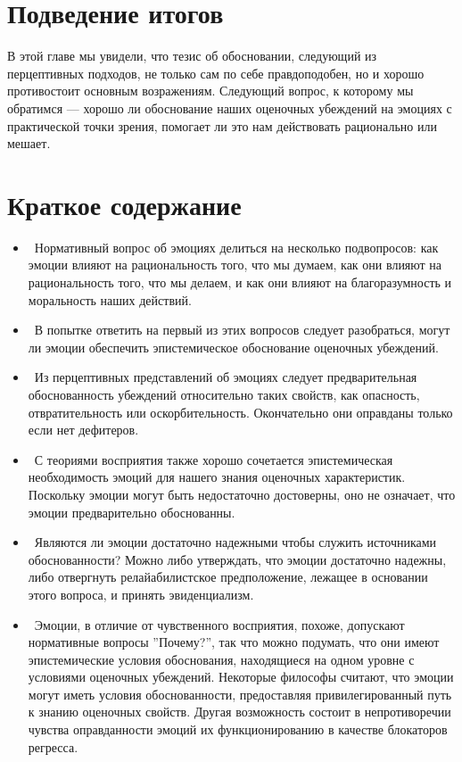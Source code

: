 \documentclass[11pt]{book}
\begin{document}
\section{Подведение итогов}

В этой главе мы увидели, что тезис об обосновании, следующий из перцептивных подходов, не только сам по себе правдоподобен, но и хорошо противостоит основным возражениям. Следующий вопрос, к которому мы обратимся --- хорошо ли обоснование наших оценочных убеждений на эмоциях с практической точки зрения, помогает ли это нам действовать рационально или мешает.

\section{Краткое содержание}

\begin{itemize}
  \item\ Нормативный вопрос об эмоциях делиться на несколько подвопросов: как эмоции влияют на рациональность того, что мы думаем, как они влияют на рациональность того, что мы делаем, и как они влияют на благоразумность и моральность наших действий.
  \item\ В попытке ответить на первый из этих вопросов следует разобраться, могут ли эмоции обеспечить эпистемическое обоснование оценочных убеждений.
  \item\ Из перцептивных представлений об эмоциях следует предварительная обоснованность убеждений относительно таких свойств, как опасность, отвратительность или оскорбительность. Окончательно они оправданы только если нет дефитеров.
  \item\ С теориями восприятия также хорошо сочетается эпистемическая необходимость эмоций для нашего знания оценочных характеристик. Поскольку эмоции могут быть недостаточно достоверны, оно не означает, что эмоции предварительно обоснованны.
  \item\ Являются ли эмоции достаточно надежными чтобы служить источниками обоснованности? Можно либо утверждать, что эмоции достаточно надежны, либо отвергнуть релайабилистское предположение, лежащее в основании этого вопроса, и принять эвиденциализм.
  \item\ Эмоции, в отличие от чувственного восприятия, похоже, допускают нормативные вопросы ''Почему?'', так что можно подумать, что они имеют эпистемические условия обоснования, находящиеся на одном уровне с условиями оценочных убеждений. Некоторые философы считают, что эмоции могут иметь условия обоснованности, предоставляя привилегированный путь к знанию оценочных свойств. Другая возможность состоит в непротиворечии чувства оправданности эмоций их функционированию в качестве блокаторов регресса.

\end{itemize}
\end{document}
